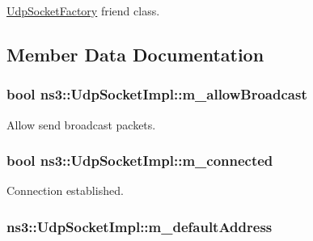 \hyperlink{classns3_1_1UdpSocketFactory}{Udp\+Socket\+Factory} friend class. 



\subsection{Member Data Documentation}
\subsubsection[{\texorpdfstring{m\+\_\+allow\+Broadcast}{m_allowBroadcast}}]{\setlength{\rightskip}{0pt plus 5cm}bool ns3\+::\+Udp\+Socket\+Impl\+::m\+\_\+allow\+Broadcast\hspace{0.3cm}{\ttfamily [private]}}\hypertarget{classns3_1_1UdpSocketImpl_a071404252802565f1d1511b5c98b155a}{}\label{classns3_1_1UdpSocketImpl_a071404252802565f1d1511b5c98b155a}


Allow send broadcast packets. 

\subsubsection[{\texorpdfstring{m\+\_\+connected}{m_connected}}]{\setlength{\rightskip}{0pt plus 5cm}bool ns3\+::\+Udp\+Socket\+Impl\+::m\+\_\+connected\hspace{0.3cm}{\ttfamily [private]}}\hypertarget{classns3_1_1UdpSocketImpl_a2df1a2df7ba0f4c852ad1d2155b1fbcc}{}\label{classns3_1_1UdpSocketImpl_a2df1a2df7ba0f4c852ad1d2155b1fbcc}


Connection established. 

\subsubsection[{\texorpdfstring{m\+\_\+default\+Address}{m_defaultAddress}}]{ ns3\+::\+Udp\+Socket\+Impl\+::m\+\_\+default\+Address\hspace{0.3cm}{\ttfamily [private]}}\hypertarget{classns3_1_1UdpSocketImpl_a820bb30415d2627cea60338649d19ccb}{}\label{classns3_1_1UdpSocketImpl_a820bb30415d2627cea60338649d19ccb}


